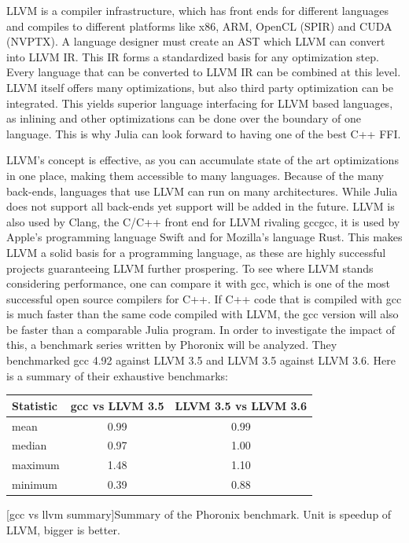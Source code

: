 \ac{LLVM} is a compiler infrastructure, which has front ends for different languages and compiles to different platforms like x86, ARM, \ac{OpenCL} (SPIR) and \ac{CUDA} (NVPTX). 
A language designer must create an \ac{AST} which \ac{LLVM} can convert into \ac{LLVM} \ac{IR}. This \ac{IR} forms a standardized basis for any optimization step. Every language that can be converted to \ac{LLVM} \ac{IR} can be combined at this level. \ac{LLVM} itself offers many optimizations, but also third party optimization can be integrated.
This yields superior language interfacing for \ac{LLVM} based languages, as inlining and other optimizations can be done over the boundary of one language.
This is why Julia can look forward to having one of the best C++ \ac{FFI}\cite{Cxx}.

\ac{LLVM}'s concept is effective, as you can accumulate state of the art optimizations in one place, making them accessible to many languages. Because of the many back-ends, languages that use \ac{LLVM} can run on many architectures. While Julia does not support all back-ends yet support will be added in the future.
\ac{LLVM} is also used by Clang\cite{Clang}, the C/C++ front end for \ac{LLVM} rivaling \ac{gcc}\ac{gcc}, it is used by Apple's programming language Swift\cite{SWIFT} and for Mozilla's language Rust\cite{Rust}.
This makes \ac{LLVM} a solid basis for a programming language, as these are highly successful projects guaranteeing \ac{LLVM} further prospering.
To see where \ac{LLVM} stands considering performance, one can compare it with \ac{gcc}, which is one of the most successful open source compilers for C++.
If C++ code that is compiled with \ac{gcc} is much faster than the same code compiled with \ac{LLVM}, the \ac{gcc} version will also be faster than a comparable Julia program.
In order to investigate the impact of this, a benchmark series written by Phoronix will be analyzed.
They benchmarked \ac{gcc} 4.92 against \ac{LLVM} 3.5 and \ac{LLVM} 3.5 against \ac{LLVM} 3.6.
Here is a summary of their exhaustive benchmarks:
\begin{table}[ht]
  \centering
  \begin{tabular}{l|c|c}
    \hline
    \textbf{Statistic} & \textbf{\ac{gcc} vs \ac{LLVM} 3.5} & \textbf{\ac{LLVM} 3.5 vs \ac{LLVM} 3.6} \\
    \hline
    mean & 0.99 & 0.99 \\
    median & 0.97 & 1.00 \\
    maximum & 1.48 & 1.10 \\
    minimum & 0.39 & 0.88 \\
    \hline
  \end{tabular}
    [gcc vs llvm summary]{Summary of the Phoronix benchmark. Unit is speedup of \ac{LLVM}, bigger is better. \cite{LLVM35vsLLVM36}\cite{LLVMvsGCC}\cite{Phoronix}}
    \label{table:gccvsllvm}
\end{table}

